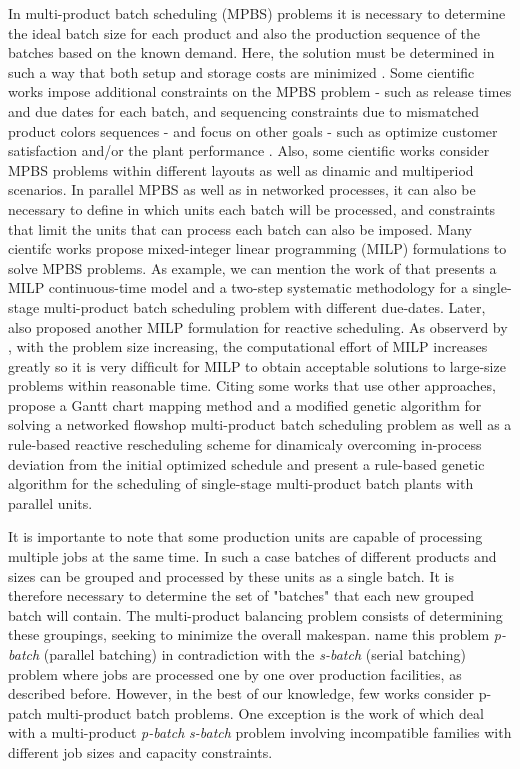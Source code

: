 \documentclass[authoryear,manuscript,12pt]{elsarticle}
\begin{document}
In multi-product batch scheduling (MPBS) problems it is necessary to determine the ideal batch size for each product and also the production sequence of the batches based on the known demand. Here, the solution must be determined in such a way that both setup and storage costs are minimized \citep{Eilon1985, Omega1993, LiuEtAl2020}. Some cientific works impose additional constraints on the MPBS problem - such as release times and due dates for each batch, and sequencing constraints due to mismatched product colors sequences - and focus on other goals - such as optimize customer satisfaction and/or the plant performance \citep{MendezEtAll2000, ShiEtAll2017}. Also, some cientific works consider MPBS problems within different layouts as well as dinamic and multiperiod scenarios. In parallel MPBS as well as in networked processes, it can also be necessary to define in which units each batch will be processed, and constraints that limit the units that can process each batch can also be imposed. Many cientifc works propose mixed-integer linear programming (MILP) formulations to solve MPBS problems. As example, we can mention the work of \cite{MendezEtAll2000} that presents a MILP continuous-time model and a two-step systematic methodology for a single-stage multi-product batch scheduling problem with different due-dates. Later, \cite{MendezCerda2003} also proposed another MILP formulation for reactive scheduling. As observerd by \cite{HeHui2008}, with the problem size increasing, the computational effort of MILP increases greatly so it is very difﬁcult for MILP to obtain acceptable solutions to large-size problems within reasonable time. Citing some works that use other approaches, \cite {KimEtAl1996} propose a Gantt chart mapping method and a modified genetic algorithm for solving a networked flowshop multi-product batch scheduling problem as well as a rule-based reactive rescheduling scheme for dinamicaly overcoming in-process deviation from the initial optimized schedule and \cite{HeHui2008} present a rule-based genetic algorithm for the scheduling of single-stage multi-product batch plants with parallel units.

It is importante to note that some production units are capable of processing multiple jobs at the same time. In such a case batches of different products and sizes can be grouped and processed by these units as a single batch. It is therefore necessary to determine the set of "batches" that each new grouped batch will contain. The multi-product balancing problem consists of determining these groupings, seeking to minimize the overall makespan. \cite{KashanOzturk2022} name this problem \emph{p-batch} (parallel batching) in contradiction with the \emph{s-batch} (serial batching) problem where jobs are processed one by one over production facilities, as described before.  However, in the best of our knowledge, few works consider p-patch multi-product batch problems. One exception is the work of \cite{LiEtAl2022} which deal with a multi-product \emph{p-batch} \emph{s-batch} problem involving incompatible families with different job sizes and capacity constraints. 
\end{document}
